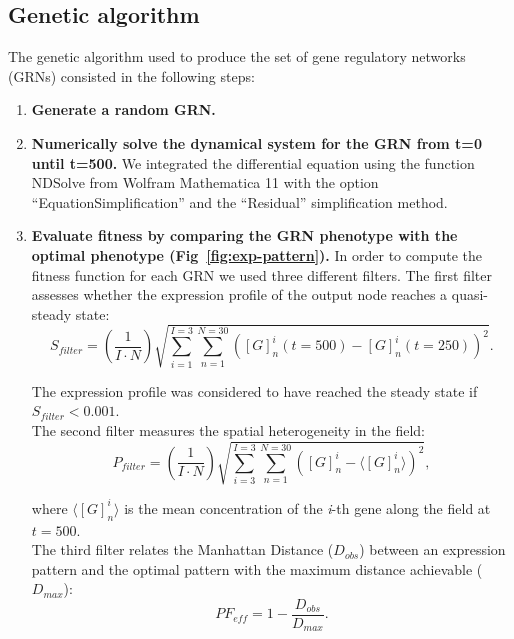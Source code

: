 \documentclass[10pt,letterpaper]{article}
\begin{document}
\subsection*{Genetic algorithm}

The genetic algorithm used to produce the set of gene regulatory networks (GRNs)
consisted in the following steps:

\begin{enumerate}
 \item{\bf Generate a random GRN.}
 
 \item{\bf Numerically solve the dynamical system for the GRN from t=0 until 
 t=500.} We integrated the differential equation using the function NDSolve from 
 Wolfram Mathematica 11 with the option “EquationSimplification” and the 
 “Residual” simplification method.
 
 \item{\bf Evaluate fitness by comparing the GRN phenotype with the optimal 
 phenotype (Fig~\ref{fig:exp-pattern}).} In order to compute the fitness 
 function for each GRN we used three different filters. The first filter 
 assesses whether the expression profile of the output node reaches a 
 quasi-steady state:
 \begin{equation}
  S_{filter} = \left( \frac{1}{I \cdot N}\right) \sqrt{\sum_{i=1}^{I=3}
  \sum_{n=1}^{N=30} ([G]_n^i(t=500) - [G]^i_n(t=250))^2}.
 \end{equation}
 
 The expression profile was considered to have reached the steady state if 
 $S_{filter} < 0.001$.\\
 
 The second filter measures the spatial heterogeneity in the field:
 \begin{equation}
  P_{filter} = \left( \frac{1}{I \cdot N} \right) \sqrt{ \sum_{i=3}^{I=3}
  \sum_{n=1}^{N=30} \left( [G]^i_n - \langle [G]^i_n \rangle \right)^2 },
 \end{equation}
 
 where $\langle [G]^i_n \rangle$ is the mean concentration of the \emph{i}-th 
 gene along the field at $t=500$.\\
 
 The third filter relates the Manhattan Distance ($D_{obs}$) between an
 expression pattern and the optimal pattern with the maximum distance achievable
 ($D_{max}$):
 \begin{equation}
  \mathit{PF}_{eff} = 1 - \frac{D_{obs}}{D_{max}}.
 \end{equation}
 

\end{enumerate}
\end{document}

